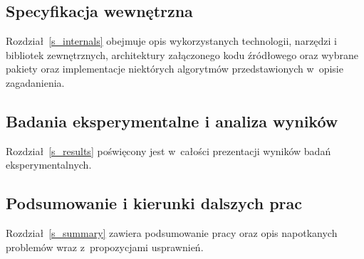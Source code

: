 \subsection{Specyfikacja wewnętrzna}
\par{
  Rozdział~\ref{s_internals} obejmuje opis wykorzystanych technologii, narzędzi i bibliotek zewnętrznych, architektury załączonego kodu źródłowego oraz wybrane pakiety oraz implementacje niektórych algorytmów przedstawionych w~opisie zagadanienia.
}
\subsection{Badania eksperymentalne i analiza wyników}
\par{
  Rozdział~\ref{s_results} poświęcony jest w~całości prezentacji wyników badań eksperymentalnych.
}
\subsection{Podsumowanie i kierunki dalszych prac}
\par{
  Rozdział~\ref{s_summary} zawiera podsumowanie pracy oraz opis napotkanych problemów wraz z~propozycjami usprawnień.
}
